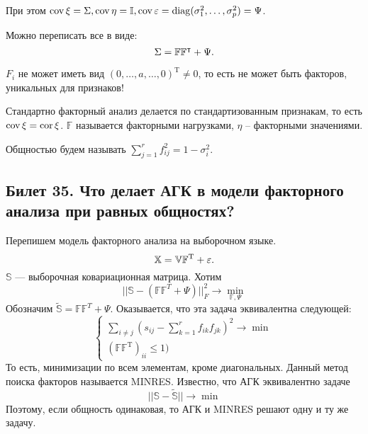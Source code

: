 При этом $\operatorname{cov} \xi = \Sigma, \operatorname{cov} \eta = \mathbb{I}, \operatorname{cov} \varepsilon = \operatorname{diag}(\sigma^2_1, \ldots, \sigma^2_p) = \Psi$.

Можно переписать все в виде:
\begin{equation*}
\Sigma = \mathbb{F}\mathbb{F}^{\intercal} + \Psi.
\end{equation*}
\begin{note}
$F_i$ не может иметь вид $(0, \ldots, a, \ldots, 0)^{\mathrm T} \ne  0$, то есть не может быть факторов, уникальных для признаков!
\end{note}

Стандартно факторный анализ делается по стандартизованным признакам, то есть $\operatorname{cov} \xi = \operatorname{cor} \xi$.
$\mathbb{F}$ называется факторными нагрузками, $\eta$ -- факторными значениями.

Общностью будем называть $\sum\limits_{j = 1}^{r} f^2_{ij} = 1 - \sigma^2_i$.

\subsection{Билет 35. Что делает АГК в модели факторного анализа при равных общностях?}
Перепишем модель факторного анализа на выборочном языке.
\begin{equation*}
\mathbb{X} = \mathbb{V}\mathbb{F}^{\mathrm T} + \varepsilon.
\end{equation*}
$\mathbb{S}$ --- выборочная ковариационная матрица. 
Хотим 
\begin{equation*}
|| \mathbb{S} - (\mathbb{F}\mathbb{F}^T + \Psi)||^2_{F} \to \min\limits_{\mathbb{F}, \Psi}
\end{equation*}
Обозначим $\tilde{\mathbb{S}} = \mathbb{F}\mathbb{F}^T + \Psi$.
Оказывается, что эта задача эквивалентна следующей:
\begin{equation*}
\begin{cases}
\sum\limits_{i \ne j}(s_{ij} - \sum\limits_{k = 1}^{r} f_{ik}f_{jk})^2 \to \min \\
(\mathbb{F}\mathbb{F}^{\mathrm T})_{ii} \le 1) 
\end{cases}
\end{equation*}
То есть, минимизации по всем элементам, кроме диагональных.
Данный метод поиска факторов называется MINRES.
Известно, что АГК эквивалентно задаче
\begin{equation}
||\mathbb{S} - \tilde{\mathbb{S}}|| \to \min
\end{equation}
Поэтому, если общность одинаковая, то АГК и MINRES решают одну и ту же задачу.
